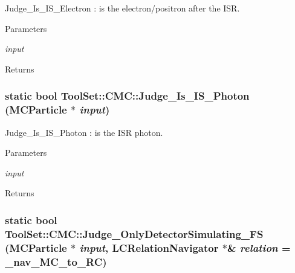Judge\_\-Is\_\-IS\_\-Electron : is the electron/positron after the ISR. 
\begin{DoxyParams}{Parameters}
\item[{\em input}]\end{DoxyParams}
\begin{DoxyReturn}{Returns}

\end{DoxyReturn}
\hypertarget{classToolSet_1_1CMC_a688d2854fa645f4c3adad5013f4c9ba2}{
\subsubsection[{Judge\_\-Is\_\-IS\_\-Photon}]{\setlength{\rightskip}{0pt plus 5cm}static bool ToolSet::CMC::Judge\_\-Is\_\-IS\_\-Photon (MCParticle $\ast$ {\em input})}}
\label{classToolSet_1_1CMC_a688d2854fa645f4c3adad5013f4c9ba2}


Judge\_\-Is\_\-IS\_\-Photon : is the ISR photon. 
\begin{DoxyParams}{Parameters}
\item[{\em input}]\end{DoxyParams}
\begin{DoxyReturn}{Returns}

\end{DoxyReturn}
\hypertarget{classToolSet_1_1CMC_a158579bb5adfcfa9e0b4bbaba7ee3229}{
\subsubsection[{Judge\_\-OnlyDetectorSimulating\_\-FS}]{\setlength{\rightskip}{0pt plus 5cm}static bool ToolSet::CMC::Judge\_\-OnlyDetectorSimulating\_\-FS (MCParticle $\ast$ {\em input}, \/  LCRelationNavigator $\ast$\& {\em relation} = {\ttfamily \_\-nav\_\-MC\_\-to\_\-RC})}}
\label{classToolSet_1_1CMC_a158579bb5adfcfa9e0b4bbaba7ee3229}


